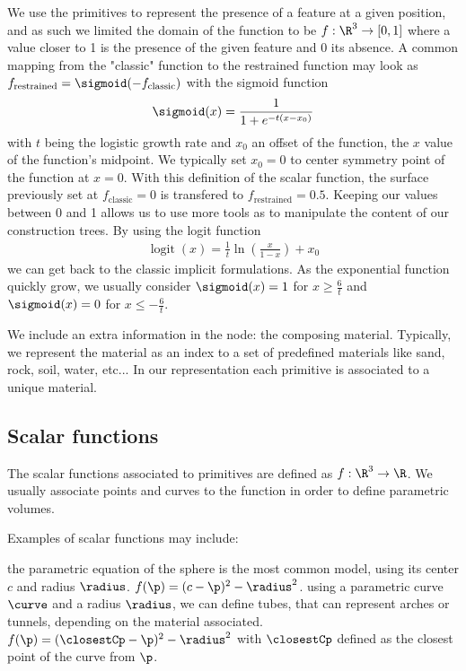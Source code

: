 We use the primitives to represent the presence of a feature at a given position, and as such we limited the domain of the function to be $f: \R^3 \to [0, 1]$ where a value closer to 1 is the presence of the given feature and 0 its absence. A common mapping from the "classic" function to the restrained function may look as $f_{\text{restrained}} = \sigmoid (- f_{\text{classic}})$ with the sigmoid function 
\begin{align}
    \sigmoid(x) = \frac{1}{1+e^{-t(x - x_0)}}
\end{align}    
with $t$ being the logistic growth rate and $x_0$ an offset of the function, the $x$ value of the function's midpoint. We typically set $x_0 = 0$ to center symmetry point of the function at $x = 0$. With this definition of the scalar function, the surface previously set at $f_{\text{classic}} = 0$ is transfered to $f_{\text{restrained}} = 0.5$. Keeping our values between 0 and 1 allows us to use more tools as to manipulate the content of our construction trees. By using the logit function 
\begin{align}
    \operatorname{logit}(x)=\frac{1}{t}\ln\left(\frac{x}{1-x}\right)+x_0
\end{align}
we can get back to the classic implicit formulations. As the exponential function quickly grow, we usually consider $\sigmoid(x)=1$ for $x \geq \frac{6}{t}$ and $\sigmoid(x)=0$ for $x \leq -\frac{6}{t}$.

We include an extra information in the node: the composing material. Typically, we represent the material as an index to a set of predefined materials like sand, rock, soil, water, etc... In our representation each primitive is associated to a unique material. 

\subsection{Scalar functions}
The scalar functions associated to primitives are defined as $f: \R^3 \to \R$. We usually associate points and curves to the function in order to define parametric volumes.

Examples of scalar functions may include:
\begin{Itemize}
     the parametric equation of the sphere is the most common model, using its center $c$ and radius $\radius$. $f(\p) = (c - \p)^2 - \radius^2$.
     using a parametric curve $\curve$ and a radius $\radius$, we can define tubes, that can represent arches or tunnels, depending on the material associated. $f(\p) = (\closestCp - \p)^2 - \radius^2$ with $\closestCp$ defined as the closest point of the curve from $\p$.
\end{Itemize}

